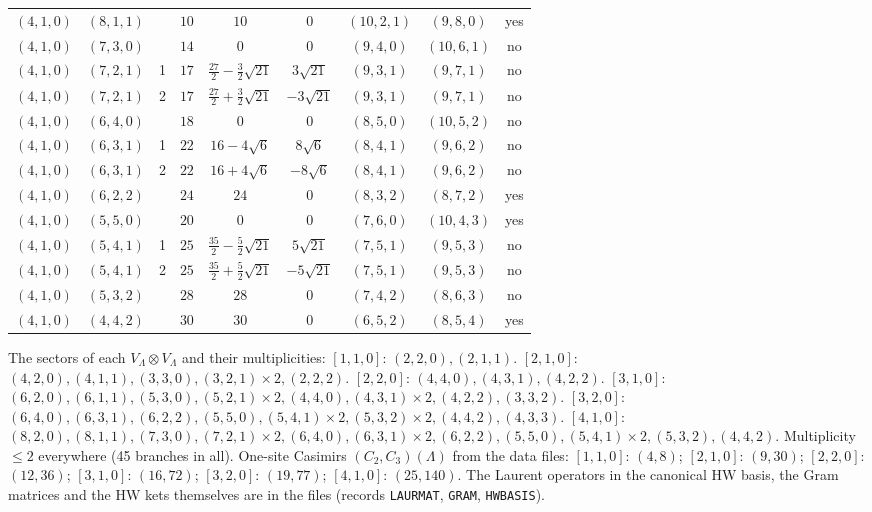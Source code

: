 \documentclass[11pt]{article}
\begin{document}
{\begin{longtable}{lllrccccc}
$(4,1,0)$ & $(8,1,1)$ &  & $10$ & $10$ & $0$ & $(10,2,1)$ & $(9,8,0)$ & yes \\
$(4,1,0)$ & $(7,3,0)$ &  & $14$ & $0$ & $0$ & $(9,4,0)$ & $(10,6,1)$ & no \\
$(4,1,0)$ & $(7,2,1)$ & 1 & $17$ & $\frac{27}{2}-\frac{3}{2}\sqrt{21}$ & $3\sqrt{21}$ & $(9,3,1)$ & $(9,7,1)$ & no \\
$(4,1,0)$ & $(7,2,1)$ & 2 & $17$ & $\frac{27}{2}+\frac{3}{2}\sqrt{21}$ & $-3\sqrt{21}$ & $(9,3,1)$ & $(9,7,1)$ & no \\
$(4,1,0)$ & $(6,4,0)$ &  & $18$ & $0$ & $0$ & $(8,5,0)$ & $(10,5,2)$ & no \\
$(4,1,0)$ & $(6,3,1)$ & 1 & $22$ & $16-4\sqrt{6}$ & $8\sqrt{6}$ & $(8,4,1)$ & $(9,6,2)$ & no \\
$(4,1,0)$ & $(6,3,1)$ & 2 & $22$ & $16+4\sqrt{6}$ & $-8\sqrt{6}$ & $(8,4,1)$ & $(9,6,2)$ & no \\
$(4,1,0)$ & $(6,2,2)$ &  & $24$ & $24$ & $0$ & $(8,3,2)$ & $(8,7,2)$ & yes \\
$(4,1,0)$ & $(5,5,0)$ &  & $20$ & $0$ & $0$ & $(7,6,0)$ & $(10,4,3)$ & yes \\
$(4,1,0)$ & $(5,4,1)$ & 1 & $25$ & $\frac{35}{2}-\frac{5}{2}\sqrt{21}$ & $5\sqrt{21}$ & $(7,5,1)$ & $(9,5,3)$ & no \\
$(4,1,0)$ & $(5,4,1)$ & 2 & $25$ & $\frac{35}{2}+\frac{5}{2}\sqrt{21}$ & $-5\sqrt{21}$ & $(7,5,1)$ & $(9,5,3)$ & no \\
$(4,1,0)$ & $(5,3,2)$ &  & $28$ & $28$ & $0$ & $(7,4,2)$ & $(8,6,3)$ & no \\
$(4,1,0)$ & $(4,4,2)$ &  & $30$ & $30$ & $0$ & $(6,5,2)$ & $(8,5,4)$ & yes \\
\end{longtable}}


The sectors of each $V_\Lambda\otimes V_\Lambda$ and their multiplicities: $[1,1,0]$: $(2,2,0),(2,1,1)$. $[2,1,0]$: $(4,2,0),(4,1,1),(3,3,0),(3,2,1)\times2,(2,2,2)$. $[2,2,0]$: $(4,4,0),(4,3,1),(4,2,2)$. $[3,1,0]$: $(6,2,0),(6,1,1),(5,3,0),(5,2,1)\times2,(4,4,0),(4,3,1)\times2,(4,2,2),(3,3,2)$. $[3,2,0]$: $(6,4,0),(6,3,1),(6,2,2),(5,5,0),(5,4,1)\times2,(5,3,2)\times2,(4,4,2),(4,3,3)$. $[4,1,0]$: $(8,2,0),(8,1,1),(7,3,0),(7,2,1)\times2,(6,4,0),(6,3,1)\times2,(6,2,2),(5,5,0),(5,4,1)\times2,(5,3,2),(4,4,2)$. Multiplicity $\le2$ everywhere (45 branches in all).
One-site Casimirs $(C_2,C_3)(\Lambda)$ from the data files: $[1,1,0]$: $(4,8)$; $[2,1,0]$: $(9,30)$; $[2,2,0]$: $(12,36)$; $[3,1,0]$: $(16,72)$; $[3,2,0]$: $(19,77)$; $[4,1,0]$: $(25,140)$. The Laurent operators in the canonical HW basis, the Gram matrices and the HW kets themselves are in the files (records \texttt{LAURMAT}, \texttt{GRAM}, \texttt{HWBASIS}).
\end{document}
